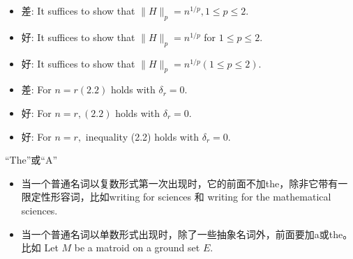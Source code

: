 \documentclass{ctexbeamer}
\begin{document}
\begin{frame}
	\begin{itemize}
	\item 
差: It suffices to show that $\|H\|_{p}=n^{1 / p}, 1 \leqslant p \leqslant 2$. \pause
	\item 
好: It suffices to show that $\|H\|_{p}=n^{1 / p}$ for $1 \leqslant p \leqslant 2$. 
\item  
好: It suffices to show that $\|H\|_{p}=n^{1 / p}(1 \leqslant p \leqslant 2)$.
	\end{itemize}
\vspace{10pt}

\begin{itemize}
	\item 
差: For $n=r(2.2)$ holds with $\delta_{r}=0$. \pause
\item 
好: For $n=r,(2.2)$ holds with $\delta_{r}=0 .$ 
\item 
好: For $n=r,$ inequality (2.2) holds with $\delta_{r}=0$.
	\end{itemize}

\end{frame}

\begin{frame}{``The''或``A''}
    
    \begin{itemize}
        \item  当一个普通名词以复数形式第一次出现时，它的前面不加the，除非它带有一限定性形容词，比如writing for sciences 和 writing for the mathematical sciences.
        \item 当一个普通名词以单数形式出现时，除了一些抽象名词外，前面要加a或the。
        比如   Let $M$ be a matroid on a ground set $E$.
        
    \end{itemize}
\end{frame}
\end{document}
